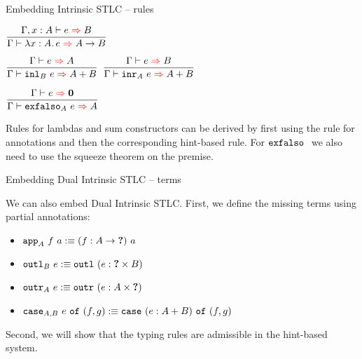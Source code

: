 \documentclass{beamer}
\begin{document}
\begin{frame}{Embedding Intrinsic STLC -- rules}

\begin{center}
  $\infrule{\fullinfer{\extend{\Gamma}{x}{A}}{e}{B}}{\infer{\ifun{x}{A}{e}}{\Fun{A}{B}}}$

  \vspace{2em}

  $\infrule{\infer{e}{A}}{\infer{\iinl{B}{e}}{\Sum{A}{B}}}$ \quad
  $\infrule{\infer{e}{B}}{\infer{\iinr{A}{e}}{\Sum{A}{B}}}$

  \vspace{2em}

  $\infrule{\infer{e}{\Empty}}{\infer{\iexfalso{A}{e}}{A}}$
\end{center}

\vspace{2em}

Rules for lambdas and sum constructors can be derived by first using the rule for annotations and then the corresponding hint-based rule. For $\texttt{exfalso}\ $ we also need to use the squeeze theorem on the premise.

\end{frame}

\begin{frame}{Embedding Dual Intrinsic STLC -- terms}

We can also embed Dual Intrinsic STLC. First, we define the missing terms using partial annotations:

\begin{itemize}
  \item $\texttt{app}_{A}\ f\ a :\equiv (f : A \to \textbf{?})\ a$
  \item $\texttt{outl}_{B}\ e :\equiv \texttt{outl}\ (e : \textbf{?} \times B)$
  \item $\texttt{outr}_{A}\ e :\equiv \texttt{outr}\ (e : A \times \textbf{?})$
  \item $\texttt{case}_{A, B}\ e\ \texttt{of}\ (f, g) :\equiv \texttt{case}\ (e : A + B)\ \texttt{of}\ (f, g)$
\end{itemize}

\vspace{2em}

Second, we will show that the typing rules are admissible in the hint-based system.

\end{frame}
\end{document}
